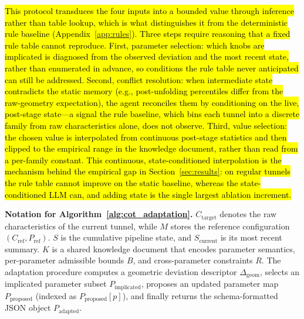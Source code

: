 \documentclass[a4paper,fleqn]{cas-dc}
\begin{document}
{%
\hl{This protocol transduces the four inputs into a bounded value through inference rather than table lookup, which is what distinguishes it from the deterministic rule baseline (Appendix~\ref{app:rules}). Three steps require reasoning that a fixed rule table cannot reproduce. First, parameter selection: which knobs are implicated is diagnosed from the observed deviation and the most recent state, rather than enumerated in advance, so conditions the rule table never anticipated can still be addressed. Second, conflict resolution: when intermediate state contradicts the static memory (e.g., post-unfolding percentiles differ from the raw-geometry expectation), the agent reconciles them by conditioning on the live, post-stage state---a signal the rule baseline, which bins each tunnel into a discrete family from raw characteristics alone, does not observe. Third, value selection: the chosen value is interpolated from continuous post-stage statistics and then clipped to the empirical range in the knowledge document, rather than read from a per-family constant. This continuous, state-conditioned interpolation is the mechanism behind the empirical gap in Section~\ref{sec:results}: on regular tunnels the rule table cannot improve on the static baseline, whereas the state-conditioned LLM can, and adding state is the single largest ablation increment.}

\noindent\textbf{Notation for Algorithm~\ref{alg:cot_adaptation}.} $C_{\text{target}}$ denotes the raw characteristics of the current tunnel, while $M$ stores the reference configuration $(C_{\text{ref}}, P_{\text{ref}})$. $S$ is the cumulative pipeline state, and $S_{\text{current}}$ is its most recent summary. $K$ is a shared knowledge document that encodes parameter semantics, per-parameter admissible bounds $B$, and cross-parameter constraints $R$. The adaptation procedure computes a geometric deviation descriptor $\Delta_{\text{geom}}$, selects an implicated parameter subset $P_{\text{implicated}}$, proposes an updated parameter map $P_{\text{proposed}}$ (indexed as $P_{\text{proposed}}[p]$), and finally returns the schema-formatted JSON object $P_{\text{adapted}}$.

}
\end{document}

